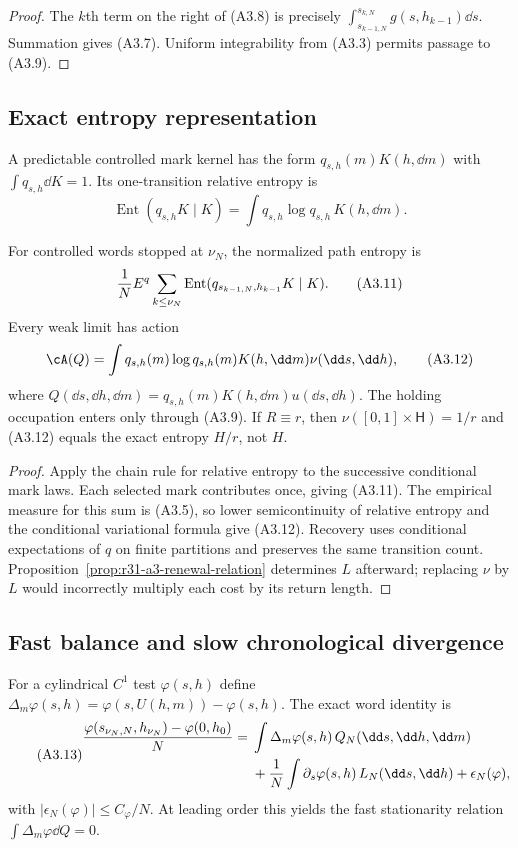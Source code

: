 \begin{proof}
The $k$th term on the right of (A3.8) is precisely
$\int_{s_{k-1,N}}^{s_{k,N}}g(s,h_{k-1})\dd s$.  Summation gives (A3.7).
Uniform integrability from (A3.3) permits passage to (A3.9).
\end{proof}

\subsection{Exact entropy representation}

A predictable controlled mark kernel has the form
$q_{s,h}(m)K(h,\dd m)$ with
$\int q_{s,h}\dd K=1$.  Its one-transition relative entropy is
\[
 \operatorname{Ent}(q_{s,h}K\mid K)
 =\int q_{s,h}\log q_{s,h}\,K(h,\dd m).                  \tag{A3.10}
\]

\begin{theorem}
\label{thm:r31-a3-action}
For controlled words stopped at $\nu_N$, the normalized path entropy is
\[
 {1\over N}E^q\sum_{k\le\nu_N}
 \operatorname{Ent}(q_{s_{k-1,N},h_{k-1}}K\mid K).        \tag{A3.11}
\]
Every weak limit has action
\[
 \cA(Q)=
 \int q_{s,h}(m)\log q_{s,h}(m)
       K(h,\dd m)\nu(\dd s,\dd h),                       \tag{A3.12}
\]
where
$Q(\dd s,\dd h,\dd m)=q_{s,h}(m)K(h,\dd m)
u(\dd s,\dd h)$.
The holding occupation enters only through (A3.9).  If $R\equiv r$, then
$\nu([0,1]\times\mathsf H)=1/r$ and (A3.12) equals the exact entropy
$H/r$, not $H$.
\end{theorem}

\begin{proof}
Apply the chain rule for relative entropy to the successive conditional mark
laws.  Each selected mark contributes once, giving (A3.11).  The empirical
measure for this sum is (A3.5), so lower semicontinuity of relative entropy
and the conditional variational formula give (A3.12).  Recovery uses
conditional expectations of $q$ on finite partitions and preserves the same
transition count.  Proposition~\ref{prop:r31-a3-renewal-relation} determines
$L$ afterward; replacing $\nu$ by $L$ would incorrectly multiply each cost by
its return length.
\end{proof}

\subsection{Fast balance and slow chronological divergence}

For a cylindrical $C^1$ test $\varphi(s,h)$ define
$\Delta_m\varphi(s,h)=\varphi(s,U(h,m))-\varphi(s,h)$.
The exact word identity is
\begin{equation}\tag{A3.13}
\begin{split}
 {\varphi(s_{\nu_N,N},h_{\nu_N})-\varphi(0,h_0)\over N}
 ={}&\int\Delta_m\varphi(s,h)\,Q_N(\dd s,\dd h,\dd m)\\
 &+{1\over N}\int\partial_s\varphi(s,h)\,L_N(\dd s,\dd h)
 +\epsilon_N(\varphi),
\end{split}
\end{equation}
with $|\epsilon_N(\varphi)|\le C_\varphi/N$.  At leading order this yields
the fast stationarity relation $\int\Delta_m\varphi\dd Q=0$.


